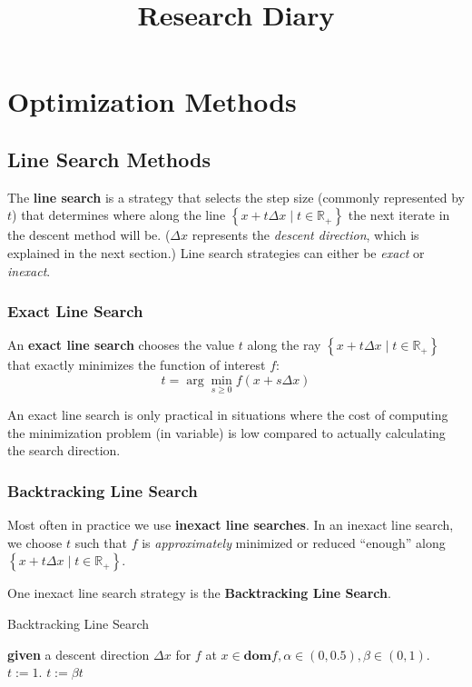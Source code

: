 \documentclass[11pt]{article}
\begin{document}
\univlogo

\title{Research Diary}


\tableofcontents\newpage

{\huge {}}

\section{Optimization Methods}
\subsection{Line Search Methods}

The {\color{tiananmen}\textbf{line search}} is a strategy that selects the step size (commonly represented by $t$) that determines where along the line $\left\lbrace x+t\Delta x\mid t\in\mathbb{R}_+\right\rbrace$ the next iterate in the descent method will be. ($\Delta x$ represents the \textit{descent direction}, which is explained in the next section.) Line search strategies can either be \textit{exact} or \textit{inexact}.

\subsubsection{Exact Line Search}

An {\color{tiananmen}\textbf{exact line search}} chooses the value $t$ along the ray $\left\lbrace x+t\Delta x\mid t\in\mathbb{R}_+\right\rbrace$ that exactly minimizes the function of interest $f$:
{\color{baystate}$$t=\arg\min_{s\geq 0}f(x+s\Delta x)$$}

An exact line search is only practical in situations where the cost of computing the minimization problem (in variable) is low compared to actually calculating the search direction.
\subsubsection{Backtracking Line Search}
Most often in practice we use {\color{tiananmen}\textbf{inexact line searches}}. In an inexact line search, we choose $t$ such that $f$ is \textit{approximately} minimized or reduced ``enough'' along $\left\lbrace x+t\Delta x\mid t\in\mathbb{R}_+\right\rbrace$.

One inexact line search strategy is the {\color{tiananmen}\textbf{Backtracking Line Search}}.
\begin{algorithm}[H]
	\caption{Backtracking Line Search \cite{Boyd2004}\label{BacktrackingLineSearchAlg}}
	\begin{algorithmic} 
		\State \textbf{given} a descent direction $\Delta x$ for $f$ at $x\in\textbf{dom}f,\alpha\in(0,0.5),\beta\in(0,1)$.
		\State $t:=1$.
			\State $t:=\beta t$
			\EndWhile
	\end{algorithmic}
\end{algorithm}
\end{document}
